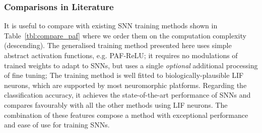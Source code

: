 	\subsubsection{Comparisons in Literature}
	It is useful to compare with existing SNN training methods shown in Table~\ref{tbl:compare_paf} where we order them on the computation complexity (descending).
	The generalised training method presented here uses simple abstract activation functions, e.g. PAF-ReLU;
	it requires no modulations of trained weights to adapt to SNNs, but uses a single \emph{optional} additional processing of fine tuning;
	The training method is well fitted to biologically-plausible LIF neurons, which are supported by most neuromorphic platforms.
	Regarding the classification accuracy, it achieves the state-of-the-art performance of SNNs and compares favourably with all the other methods using LIF neurons.
	The combination of these features compose a method with exceptional performance and ease of use for training SNNs.
	
